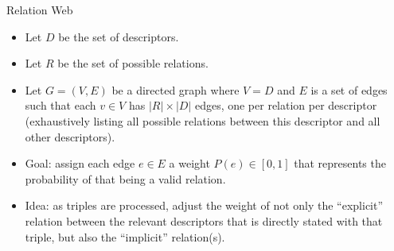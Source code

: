 \documentclass[a4paper]{article}
\begin{document}
Relation Web
\begin{itemize}
    \item Let $D$ be the set of descriptors.
    \item Let $R$ be the set of possible relations.
    \item Let $G = \left( V, E \right)$ be a directed graph where $V = D$ and
        $E$ is a set of edges such that each $v \in V$ has $|R| \times |D|$
        edges, one per relation per descriptor (exhaustively listing all 
        possible relations between this descriptor and all other descriptors).
    \item Goal: assign each edge $e \in E$ a weight $P(e) \in [0, 1]$ that
        represents the probability of that being a valid relation.
    \item Idea: as triples are processed, adjust the weight of not only the 
        ``explicit'' relation between the relevant descriptors that is directly
        stated with that triple, but also the ``implicit'' relation(s).
\end{itemize}

\end{document}
